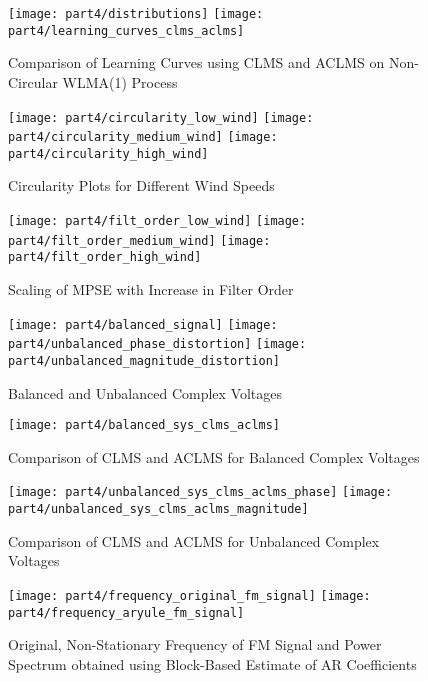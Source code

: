 \begin{figure}[H]
\centering{}
\texttt{[image: part4/distributions]}
\texttt{[image: part4/learning\_curves\_clms\_aclms]}
\caption{Comparison of Learning Curves using CLMS and ACLMS on Non-Circular WLMA(1) Process}
\end{figure}

\begin{figure}[H]
\centering{}
\texttt{[image: part4/circularity\_low\_wind]}
\texttt{[image: part4/circularity\_medium\_wind]}
\texttt{[image: part4/circularity\_high\_wind]}
\caption{Circularity Plots for Different Wind Speeds}
\end{figure}


\begin{figure}[H]
\centering{}
\texttt{[image: part4/filt\_order\_low\_wind]}
\texttt{[image: part4/filt\_order\_medium\_wind]}
\texttt{[image: part4/filt\_order\_high\_wind]}
\caption{Scaling of MPSE with Increase in Filter Order}
\end{figure}


\begin{figure}[H]
\centering{}
\texttt{[image: part4/balanced\_signal]}
\texttt{[image: part4/unbalanced\_phase\_distortion]}
\texttt{[image: part4/unbalanced\_magnitude\_distortion]}
\caption{Balanced and Unbalanced Complex Voltages}
\end{figure}

\begin{figure}[H]
\centering{}
\texttt{[image: part4/balanced\_sys\_clms\_aclms]}
\caption{Comparison of CLMS and ACLMS for Balanced Complex Voltages}
\end{figure}

\begin{figure}[H]
\centering{}
\texttt{[image: part4/unbalanced\_sys\_clms\_aclms\_phase]}
\texttt{[image: part4/unbalanced\_sys\_clms\_aclms\_magnitude]}
\caption{Comparison of CLMS and ACLMS for Unbalanced Complex Voltages}
\end{figure}

\begin{figure}[H]
\centering{}
\texttt{[image: part4/frequency\_original\_fm\_signal]}
\texttt{[image: part4/frequency\_aryule\_fm\_signal]}
\caption{Original, Non-Stationary Frequency of FM Signal and Power Spectrum obtained using Block-Based Estimate of AR Coefficients}
\end{figure}

